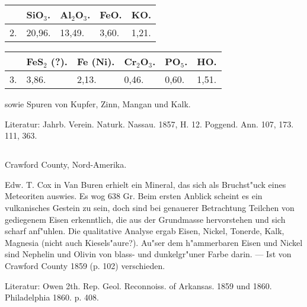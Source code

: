 \documentclass[a4paper, 11pt, oneside]{article}
\begin{document}
\begin{table}[H]
    \centering\swabfamily\Large
    \begin{tabular}{l l l l l}
        ~ & SiO$_{3}$. & Al$_{2}$O$_{3}$. & FeO. & KO. \\ \hline
        2. & 20,96. & 13,49. & 3,60. & 1,21. \\
    \end{tabular}
\end{table}

\begin{table}[H]
    \centering\swabfamily\Large
    \begin{tabular}{l l l l l l}
        ~ & FeS$_{2}$ (?). & Fe (Ni). & Cr$_{2}$O$_{3}$. & PO$_{5}$. & HO. \\ \hline
        3. & 3,86. & 2,13. & 0,46. & 0,60. & 1,51. \\
    \end{tabular}
\end{table}

sowie Spuren von Kupfer, Zinn, Mangan und Kalk.

\normalsize
Literatur: Jahrb. Verein. Naturk. Nassau. 1857, H. 12. Poggend. Ann. 107, 173. 111, 363.

\subsection{}
\LARGE
\paragraph{}
Crawford County, Nord-Amerika.

Edw. T. Cox in Van Buren erhielt ein Mineral, das sich als Bruchst"uck eines Meteoriten auswies. Es wog 638 Gr. Beim ersten Anblick scheint es ein vulkanisches Gestein zu sein, doch sind bei genauerer Betrachtung Teilchen von gediegenem Eisen erkenntlich, die aus der Grundmasse hervorstehen und sich scharf anf"uhlen. Die qualitative Analyse ergab Eisen, Nickel, Tonerde, Kalk, Magnesia (nicht auch Kiesels"aure?). Au"ser dem h"ammerbaren Eisen und Nickel sind Nephelin und Olivin von blass- und dunkelgr"uner Farbe darin. --- Ist von Crawford County 1859 (p. 102) verschieden.

\normalsize
Literatur: Owen 2th. Rep. Geol. Reconnoiss. of Arkansas. 1859 und 1860. Philadelphia 1860. p. 408.
\clearpage
\LARGE
\section{}
\end{document}
